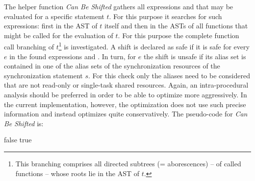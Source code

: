 The helper function \textit{Can Be Shifted} gathers all expressions  and  that may be evaluated for a specific statement $t$. For this purpose it searches for such expressions: first in the AST of $t$ itself and then in the ASTs of all functions that might be called for the evaluation of $t$. For this purpose the complete function call branching of $t$\footnote{This branching comprises all directed subtrees (= aborescences) -- of called functions -- whose roots lie in the AST of $t$.} is investigated. A shift is declared as safe if it is safe for every $e$ in the found expressions  and . In turn, for $e$ the shift is unsafe if its alias set is contained in one of the alias sets of the synchronization resources of the synchronization statement $s$. For this check only the aliases need to be considered that are not read-only or single-task shared resources. Again, an intra-procedural analysis should be preferred in order to be able to optimize more aggressively. In the current implementation, however, the optimization does not use such precise information and instead optimizes quite conservatively. The pseudo-code for 
\textit{Can Be Shifted} is:
\begin{algorithmic}
\State {}
    \State \Return false
  \EndIf
\EndFor
\State \Return true
\EndFunction
\end{algorithmic}



